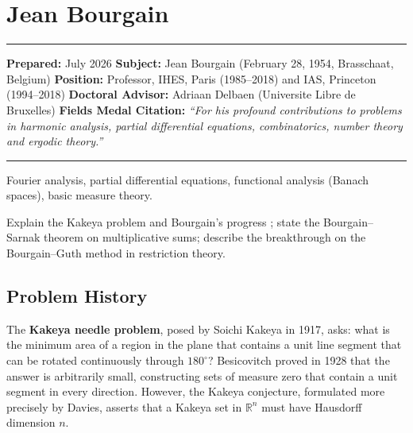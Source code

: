 \chapter{Jean Bourgain}\label{ch1994jeanbourgain:jean-bourgain-fields-medal-1994-a-comprehensive-report-on-his-work-and-impact}

\begin{center}\rule{0.5\linewidth}{0.5pt}\end{center}

\textbf{Prepared:} July 2026
\textbf{Subject:} Jean Bourgain (February 28, 1954, Brasschaat, Belgium)
\textbf{Position:} Professor, IHES, Paris (1985--2018) and IAS, Princeton (1994--2018)
\textbf{Doctoral Advisor:} Adriaan Delbaen (Universite Libre de Bruxelles)
\textbf{Fields Medal Citation:} \emph{``For his profound contributions to problems
in harmonic analysis, partial differential equations, combinatorics,
number theory and ergodic theory.''}

\begin{center}\rule{0.5\linewidth}{0.5pt}\end{center}

\begin{prereqs}
Fourier analysis, partial differential equations, functional
analysis (Banach spaces), basic measure theory.
\end{prereqs}

\begin{objectives}
Explain the Kakeya problem and Bourgain's progress \cite{bourgain1989}; state the
Bourgain--Sarnak theorem on multiplicative sums; describe the
breakthrough on the Bourgain--Guth method in restriction theory.
\end{objectives}

\section{Problem History}

The \textbf{Kakeya needle problem}, posed by Soichi Kakeya in 1917,
asks: what is the minimum area of a region in the plane that
contains a unit line segment that can be rotated continuously
through $180^\circ$?  Besicovitch proved in 1928 that the answer is
arbitrarily small, constructing sets of measure zero that contain a
unit segment in every direction.  However, the Kakeya conjecture,
formulated more precisely by Davies, asserts that a Kakeya set in
$\mathbb{R}^n$ must have Hausdorff dimension $n$.


